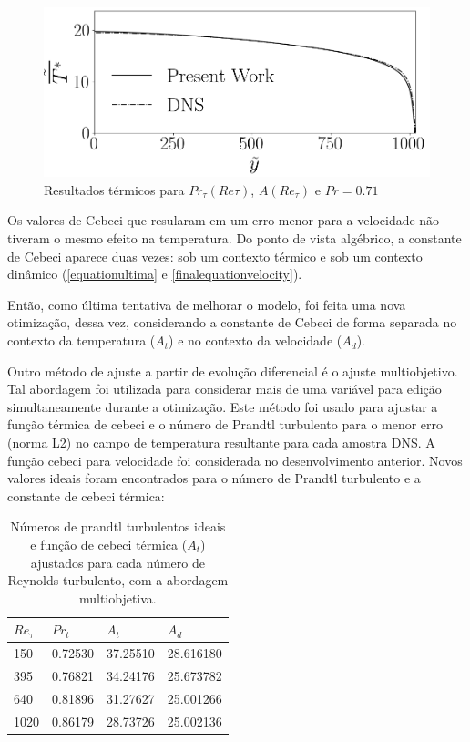 \begin{figure}[!h]
\begin{minipage}[t]{0.5\textwidth}
	\end{minipage}
	\begin{minipage}[t]{0.45\textwidth}
		\centering
		\includegraphics[angle=0, scale=0.34]{fotos_formatacao_final/Temperature_1000_071_Prt(Ret)_Avelocity}
	\end{minipage}	
	\caption{Resultados térmicos para $Pr_\tau(Re\tau)$, $A(Re_\tau)$ e $Pr =0.71$ }
\end{figure}

Os valores de Cebeci que resularam em um erro menor para a velocidade não tiveram o mesmo efeito na temperatura. Do ponto de vista algébrico, a constante de Cebeci aparece duas vezes: sob um contexto térmico e sob um contexto dinâmico (\ref{equationultima} e \ref{finalequationvelocity}).

Então, como última tentativa de melhorar o modelo, foi feita uma nova otimização, dessa vez, considerando a constante de Cebeci de forma separada no contexto da temperatura ($A_t$) e no contexto da velocidade ($A_d$).

Outro método de ajuste a partir de evolução diferencial é o ajuste multiobjetivo. Tal abordagem foi utilizada para considerar mais de uma variável para edição simultaneamente durante a otimização. Este método foi usado para ajustar a função térmica de cebeci e o número de Prandtl turbulento para o menor erro (norma L2) no campo de temperatura resultante para cada amostra DNS. A função cebeci para velocidade foi considerada no desenvolvimento anterior. Novos valores ideais foram encontrados para o número de Prandtl turbulento e a constante de cebeci térmica:

\begin{table}[!h]
	\centering
	\caption{Números de prandtl turbulentos ideais e função de cebeci térmica ($A_t$) ajustados para cada número de Reynolds turbulento, com a abordagem multiobjetiva.}
	\begin{tabular}{llll}
		\hline
		$Re_\tau$ & $Pr_t$ & $A_t$ & $A_d$\\
		\hline
		150  &   0.72530 & 37.25510 & 28.616180\\
		395  &   0.76821 & 34.24176 & 25.673782\\
		640  &   0.81896 & 31.27627 & 25.001266\\
		1020 &   0.86179 & 28.73726 & 25.002136\\ 
		\hline
	\end{tabular}
\end{table}

